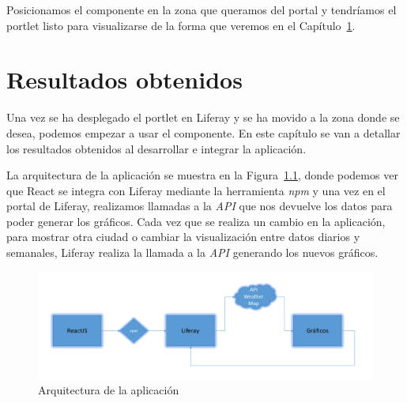 \documentclass[a4paper, 12pt]{book}
\begin{document}
\vspace{5mm}
Posicionamos el componente en la zona que queramos del portal y tendríamos el portlet listo para visualizarse de la forma que veremos en el Capítulo~\ref{chap:resultados_obtenidos}.




\cleardoublepage
\chapter{Resultados obtenidos}
\label{chap:resultados_obtenidos}
Una vez se ha desplegado el portlet en Liferay y se ha movido a la zona donde se desea, podemos empezar a usar el componente. En este capítulo se van a detallar los resultados obtenidos al desarrollar e integrar la aplicación.

La arquitectura de la aplicación se muestra en la Figura~\ref{fig:arquitectura}, donde podemos ver que React se integra con Liferay mediante la herramienta \textit{npm} y una vez en el portal de Liferay, realizamos llamadas a la \textit{API} que nos devuelve los datos para poder generar los gráficos. Cada vez que se realiza un cambio en la aplicación, para mostrar otra ciudad o cambiar la visualización entre datos diarios y semanales, Liferay realiza la llamada a la \textit{API} generando los nuevos gráficos.
\begin{figure}[h]
  \centering
  \includegraphics[width=18cm]{img_usadas/arquitectura.png}
  \caption{Arquitectura de la aplicación}
  \label{fig:arquitectura}
\end{figure}
\end{document}
